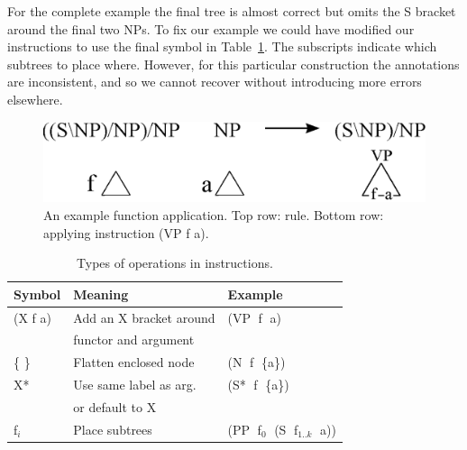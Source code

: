 
For the complete example the final tree is almost correct but omits the S
bracket around the final two NPs.  To fix our example we could have modified
our instructions to use the final symbol in Table~\ref{tab:operators}.  The
subscripts indicate which subtrees to place where.
However, for this particular construction the \ptb annotations are
inconsistent, and so we cannot recover without introducing more errors elsewhere.

\begin{figure}
\begin{center}
\includegraphics[width=0.85\linewidth]{figures/ccg-example}
\end{center}
\vspace{-5mm}
\caption{\label{fig:inst-example}
An example function application.
Top row: \ccg rule.
Bottom row: applying instruction (VP f a).
}
\vspace{-1mm}
\end{figure}

\begin{table}
\small
\begin{center}
\renewcommand{\tabcolsep}{1mm}
\begin{tabular}{lll}
	\hline
		Symbol & Meaning & Example \\
	\hline
	\hline
		(X f a) & Add an X bracket around & (VP$\;$ f$\;$ a) \\
		& functor and argument \\
		\{ \} & Flatten enclosed node & (N$\;$ f$\;$ \{a\}) \\
		X* & Use same label as arg. & (S*$\;$ f$\;$ \{a\}) \\
		& or default to X \\
		f$_i$ & Place subtrees &  (PP$\;$ f$_0$$\;$ (S$\;$ f$_{1..k}$$\;$ a)) \\
	\hline
\end{tabular}
\end{center}
\vspace{-4.5mm}
\caption{\label{tab:operators}
Types of operations in instructions.
}
\vspace{-5mm}
\end{table}

